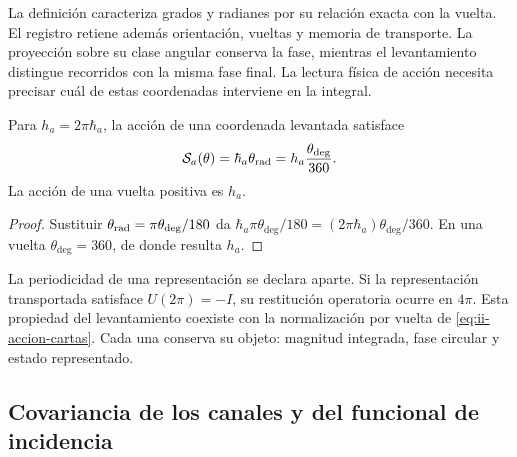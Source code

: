 La definición caracteriza grados y radianes por su relación exacta
con la vuelta. El registro retiene además orientación, vueltas y
memoria de transporte. La proyección sobre su clase angular conserva
la fase, mientras el levantamiento distingue recorridos con la misma
fase final. La lectura física de acción necesita precisar cuál de
estas coordenadas interviene en la integral.

\begin{proposition}
Para \(h_a=2\pi\hbar_a\), la acción de una coordenada levantada
satisface
\begin{equation}
 \mathcal S_a(\theta)
 =\hbar_a\theta_{\rm rad}
 =h_a\frac{\theta_{\deg}}{360}.
 \label{eq:ii-accion-cartas}
\end{equation}
La acción de una vuelta positiva es \(h_a\).
\end{proposition}
\begin{proof}
Sustituir \(\theta_{\rm rad}=\pi\theta_{\deg}/180\) da
\(\hbar_a\pi\theta_{\deg}/180
=(2\pi\hbar_a)\theta_{\deg}/360\). En una vuelta
\(\theta_{\deg}=360\), de donde resulta \(h_a\).
\end{proof}

La periodicidad de una representación se declara aparte. Si la
representación transportada satisface \(U(2\pi)=-I\), su restitución
operatoria ocurre en \(4\pi\). Esta propiedad del levantamiento
coexiste con la normalización por vuelta de
\eqref{eq:ii-accion-cartas}. Cada una conserva su objeto: magnitud
integrada, fase circular y estado representado.

\subsection{Covariancia de los canales y del funcional de incidencia}

